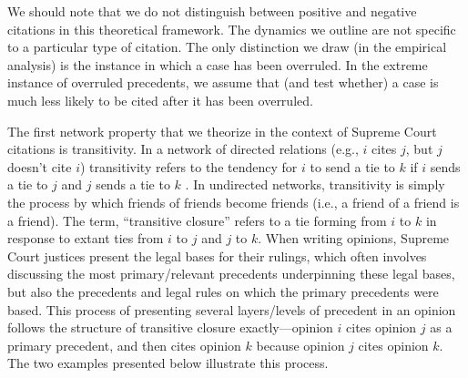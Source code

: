 \documentclass[headsepline=true, abstracton]{scrartcl}
\begin{document}
We should note that we do not distinguish between positive and negative citations in this theoretical framework. The dynamics we outline are not specific to a particular type of citation. The only distinction we draw (in the empirical analysis) is the instance in which a case has been overruled. In the extreme instance of overruled precedents, we assume that (and test whether) a case is much less likely to be cited after it has been overruled.

The first network property that we theorize in the context of Supreme Court citations is transitivity. In a network of directed relations (e.g., $i$ cites $j$, but $j$ doesn't cite $i$) transitivity refers to the tendency for $i$ to send a tie to $k$ if $i$ sends a tie to $j$ and $j$ sends a tie to $k$ \citep{holland1971transitivity,hallinan1990sex}. In undirected networks, transitivity is simply the process by which friends of friends become friends (i.e., a friend of a friend is a friend). The term, ``transitive closure'' refers to a tie forming from $i$ to $k$ in response to extant ties from $i$ to $j$ and $j$ to $k$. When writing opinions, Supreme Court justices present the legal bases for their rulings, which often involves discussing the most primary/relevant precedents underpinning these legal bases, but also the precedents and legal rules on which the primary precedents were based. This process of presenting several layers/levels of precedent in an opinion follows the structure of transitive closure exactly---opinion $i$ cites opinion $j$ as a primary precedent, and then cites opinion $k$ because opinion $j$ cites opinion $k$. The two examples presented below illustrate this process.
\end{document}
